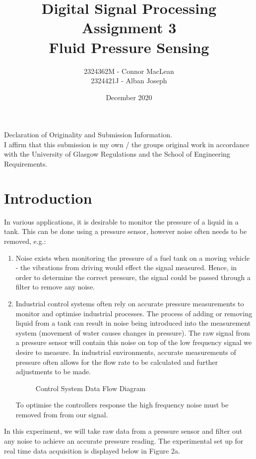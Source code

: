 \documentclass{article}
\title{Digital Signal Processing\\Assignment 3\\Fluid Pressure Sensing}
\author{2324362M - Connor MacLean\\2324421J - Alban Joseph}
\date{December 2020}
\begin{document}
\maketitle
Declaration of Originality and Submission Information.\\
I affirm that this submission is my own / the groups original work in accordance with the University of Glasgow Regulations and the School of Engineering Requirements.
\section{Introduction}
In various applications, it is desirable to monitor the pressure of a liquid in a tank. This can be done using a pressure sensor, however noise often needs to be removed, e.g.:
\begin{enumerate}
  \item Noise exists when monitoring the pressure of a fuel tank on a moving vehicle - the vibrations from driving would effect the signal measured. Hence, in order to determine the correct pressure, the signal could be passed through a filter to remove any noise.
  \item Industrial control systems often rely on accurate pressure measurements to monitor and optimise industrial processes. The process of adding or removing liquid from a tank can result in noise being introduced into the measurement system (movement of water causes changes in pressure). The raw signal from a pressure sensor will contain this noise on top of the low frequency signal we desire to measure. In industrial environments, accurate measurements of pressure often allows for the flow rate to be calculated and further adjustments to be made.
\begin{figure}[H]
    \centering
    
    \caption{Control System Data Flow Diagram}
    \label{fig:controlSys}
\end{figure}
To optimise the controllers response the high frequency noise must be removed from from our signal.
\end{enumerate}
In this experiment, we will take raw data from a pressure sensor and filter out any noise to achieve an accurate pressure reading. The experimental set up for real time data acquisition is displayed below in Figure 2a.
\end{document}
